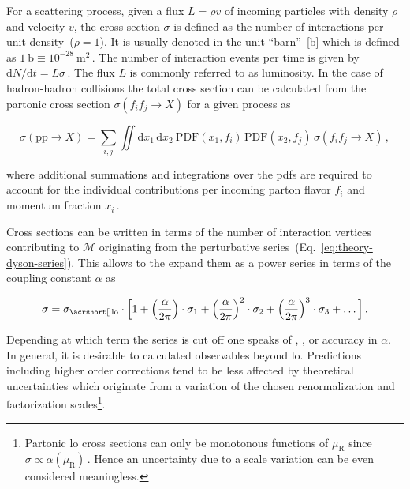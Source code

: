 For a scattering process, given a flux $L=\rho v$ of incoming particles with density $\rho$ and velocity $v$, the cross section $\sigma$ is defined as the number of interactions per unit density~($\rho=1$). It is usually denoted in the unit ``barn''~[$\mathrm{b}$] which is defined as $1~\mathrm{b}\equiv 10^{-28}~\mathrm{m}^{2}\,$.  The number of interaction events per time is given by $\mathrm{d}N/\mathrm{d}t=L\sigma\,$. The flux $L$ is commonly referred to as luminosity. In the case of hadron-hadron collisions the total cross section can be calculated from the partonic cross section $\sigma(f_{i}f_{j}\to X)$ for a given process  as

\begin{equation}
\sigma(\mathrm{pp}\to X)=\sum_{i,j}\iint\mathrm{d}x_{1}\,\mathrm{d}x_{2}~\mathrm{PDF}(x_{1},f_{i})\,\mathrm{PDF}(x_{2},f_{j})\,\sigma(f_{i}f_{j}\to X)\,,
\end{equation}

where additional summations and integrations over the \glspl{pdf} are required to account for the individual contributions per incoming parton flavor $f_{i}$ and momentum fraction $x_{i}\,$.

Cross sections can be written in terms of the number of interaction vertices contributing to $\mathcal{M}$ originating from the perturbative series~(Eq.~\ref{eq:theory-dyson-series}). This allows to the expand them as a power series in terms of the coupling constant $\alpha$ as

\begin{equation}
\sigma=\sigma_\mathrm{\gls{lo}}\cdot\Big[1+\Big(\frac{\alpha}{2\pi}\Big)\cdot\sigma_\mathrm{1}+\Big(\frac{\alpha}{2\pi}\Big)^2\cdot\sigma_{2}+\Big(\frac{\alpha}{2\pi}\Big)^{3}\cdot\sigma_{3}+\ldots\Big]\,.
\end{equation}

Depending at which term the series is cut off one speaks of , , or  accuracy in $\alpha$. In general, it is desirable to calculated observables beyond \gls{lo}. Predictions including higher order corrections tend to be less affected by theoretical uncertainties which originate from a variation of the chosen renormalization and factorization scales\footnote{Partonic \gls{lo} cross sections can only be monotonous functions of $\mu_\mathrm{R}$ since $\sigma\propto\alpha(\mu_\mathrm{R})$\,. Hence an uncertainty due to a scale variation can be even considered meaningless.}.

